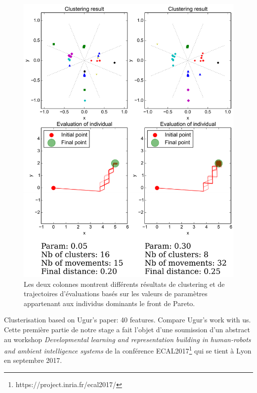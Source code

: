 \documentclass{llncs}
\begin{document}
\begin{figure}[!tbp]
\begin{minipage}[b]{0.5\textwidth}
    \includegraphics[width=\textwidth]{figures/Benchmark_3.pdf}
    \caption{Les deux colonnes montrent différents résultats de clustering et de trajectoires d'évaluations basés sur les valeurs de paramètres appartenant aux individus dominants le front de Pareto.}
    \label{fig:results}
  \end{minipage}
\end{figure}


Clusterisation based on Ugur's paper: 40 features. Compare Ugur's work with us.\\

Cette première partie de notre stage a fait l'objet d'une soumission d'un abstract au workshop \textit{Developmental learning and representation building in human-robots and ambient intelligence systems} de la conférence ECAL2017\footnote{https://project.inria.fr/ecal2017/} qui se tient à Lyon en septembre 2017.
\end{document}
